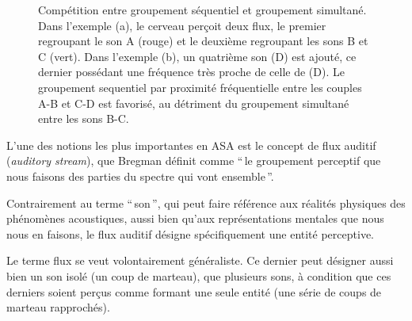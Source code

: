 \begin{figure}[t]
        \myfloatalign
        \caption[Compétition entre groupement séquentiel et groupement simultané]{Compétition entre groupement séquentiel et groupement simultané. Dans l'exemple (a), le cerveau perçoit deux flux, le premier regroupant le son A (rouge) et le deuxième regroupant les sons B et C (vert). Dans l'exemple (b), un quatrième son (D) est ajouté, ce dernier possédant une fréquence très proche de celle de (D). Le groupement sequentiel par proximité fréquentielle entre les couples A-B et C-D est favorisé, au détriment du groupement simultané entre les sons B-C.}\label{fig:simvsseq}
\end{figure}

L'une des notions les plus importantes en ASA est le concept de flux auditif (\emph{auditory stream}), que Bregman définit comme ``\,le groupement perceptif que nous faisons des parties du spectre qui vont ensemble\,''.

Contrairement au terme ``\,son\,'', qui peut faire référence aux réalités physiques des phénomènes acoustiques, aussi bien qu'aux représentations mentales que nous nous en faisons, le flux auditif désigne spécifiquement une entité perceptive.

Le terme flux se veut volontairement généraliste. Ce dernier peut désigner aussi bien un son isolé (un coup de marteau), que plusieurs sons, à condition que ces derniers soient perçus comme formant une seule entité (une série de coups de marteau rapprochés).

